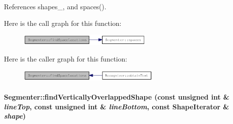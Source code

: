 References shapes\_\-, and spaces().

Here is the call graph for this function:\nopagebreak
\begin{figure}[H]
\begin{center}
\leavevmode
\includegraphics[width=187pt]{class_segmenter_7f4ab775f61d92c4d051f6ef4685cf6f_cgraph}
\end{center}
\end{figure}


Here is the caller graph for this function:\nopagebreak
\begin{figure}[H]
\begin{center}
\leavevmode
\includegraphics[width=197pt]{class_segmenter_7f4ab775f61d92c4d051f6ef4685cf6f_icgraph}
\end{center}
\end{figure}
\hypertarget{class_segmenter_0961de0db6a0b1de51882024bfc830a1}{
\paragraph[{findVerticallyOverlappedShape}]{ Segmenter::findVerticallyOverlappedShape (const unsigned int \& {\em lineTop}, \/  const unsigned int \& {\em lineBottom}, \/  const {\bf ShapeIterator} \& {\em shape})}\hfill}
\label{class_segmenter_0961de0db6a0b1de51882024bfc830a1}


